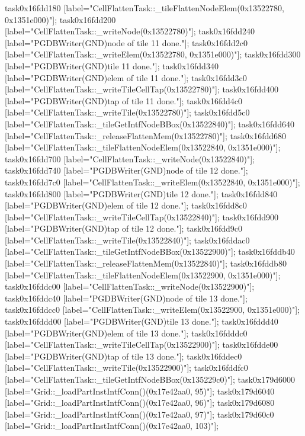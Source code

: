 {	task0x16fdd180 [label="CellFlattenTask::_tileFlattenNodeElem(0x13522780, 0x1351e000)"];
	task0x16fdd200 [label="CellFlattenTask::_writeNode(0x13522780)"];
	task0x16fdd240 [label="PGDBWriter(GND)\nCell node of tile 11 done."];
	task0x16fdd2c0 [label="CellFlattenTask::_writeElem(0x13522780, 0x1351e000)"];
	task0x16fdd300 [label="PGDBWriter(GND)\nCell tile 11 done."];
	task0x16fdd340 [label="PGDBWriter(GND)\nCell elem of tile 11 done."];
	task0x16fdd3c0 [label="CellFlattenTask::_writeTileCellTap(0x13522780)"];
	task0x16fdd400 [label="PGDBWriter(GND)\nCell tap of tile 11 done."];
	task0x16fdd4c0 [label="CellFlattenTask::_writeTile(0x13522780)"];
	task0x16fdd5c0 [label="CellFlattenTask::_tileGetIntfNodeBBox(0x13522840)"];
	task0x16fdd640 [label="CellFlattenTask::_releaseFlattenMem(0x13522780)"];
	task0x16fdd680 [label="CellFlattenTask::_tileFlattenNodeElem(0x13522840, 0x1351e000)"];
	task0x16fdd700 [label="CellFlattenTask::_writeNode(0x13522840)"];
	task0x16fdd740 [label="PGDBWriter(GND)\nCell node of tile 12 done."];
	task0x16fdd7c0 [label="CellFlattenTask::_writeElem(0x13522840, 0x1351e000)"];
	task0x16fdd800 [label="PGDBWriter(GND)\nCell tile 12 done."];
	task0x16fdd840 [label="PGDBWriter(GND)\nCell elem of tile 12 done."];
	task0x16fdd8c0 [label="CellFlattenTask::_writeTileCellTap(0x13522840)"];
	task0x16fdd900 [label="PGDBWriter(GND)\nCell tap of tile 12 done."];
	task0x16fdd9c0 [label="CellFlattenTask::_writeTile(0x13522840)"];
	task0x16fddac0 [label="CellFlattenTask::_tileGetIntfNodeBBox(0x13522900)"];
	task0x16fddb40 [label="CellFlattenTask::_releaseFlattenMem(0x13522840)"];
	task0x16fddb80 [label="CellFlattenTask::_tileFlattenNodeElem(0x13522900, 0x1351e000)"];
	task0x16fddc00 [label="CellFlattenTask::_writeNode(0x13522900)"];
	task0x16fddc40 [label="PGDBWriter(GND)\nCell node of tile 13 done."];
	task0x16fddcc0 [label="CellFlattenTask::_writeElem(0x13522900, 0x1351e000)"];
	task0x16fddd00 [label="PGDBWriter(GND)\nCell tile 13 done."];
	task0x16fddd40 [label="PGDBWriter(GND)\nCell elem of tile 13 done."];
	task0x16fdddc0 [label="CellFlattenTask::_writeTileCellTap(0x13522900)"];
	task0x16fdde00 [label="PGDBWriter(GND)\nCell tap of tile 13 done."];
	task0x16fddec0 [label="CellFlattenTask::_writeTile(0x13522900)"];
	task0x16fddfc0 [label="CellFlattenTask::_tileGetIntfNodeBBox(0x135229c0)"];
	task0x179d6000 [label="Grid::_loadPartInstIntfConn()(0x17e42aa0, 95)"];
	task0x179d6040 [label="Grid::_loadPartInstIntfConn()(0x17e42aa0, 96)"];
	task0x179d6080 [label="Grid::_loadPartInstIntfConn()(0x17e42aa0, 97)"];
	task0x179d60c0 [label="Grid::_loadPartInstIntfConn()(0x17e42aa0, 103)"];
}

